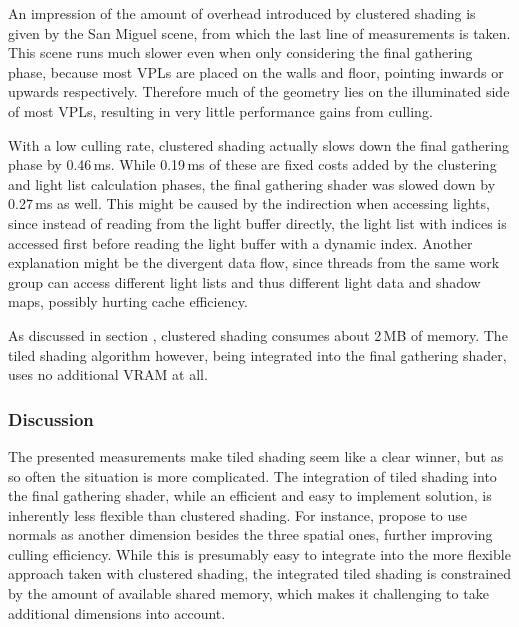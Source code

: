 An impression of the amount of overhead introduced by clustered shading is given by the San Miguel scene, from which the last line of measurements is taken. This scene runs much slower even when only considering the final gathering phase, because most VPLs are placed on the walls and floor, pointing inwards or upwards respectively. Therefore much of the geometry lies on the illuminated side of most VPLs, resulting in very little performance gains from culling.

With a low culling rate, clustered shading actually slows down the final gathering phase by 0.46\,ms. While 0.19\,ms of these are fixed costs added by the clustering and light list calculation phases, the final gathering shader was slowed down by 0.27\,ms as well. This might be caused by the indirection when accessing lights, since instead of reading from the light buffer directly, the light list with indices is accessed first before reading the light buffer with a dynamic index. Another explanation might be the divergent data flow, since threads from the same work group can access different light lists and thus different light data and shadow maps, possibly hurting cache efficiency.

As discussed in section , clustered shading consumes about 2\,MB of memory. The tiled shading algorithm however, being integrated into the final gathering shader, uses no additional VRAM at all.

\subsubsection{Discussion}

The presented measurements make tiled shading seem like a clear winner, but as so often the situation is more complicated. The integration of tiled shading into the final gathering shader, while an efficient and easy to implement solution, is inherently less flexible than clustered shading. For instance, \citet{olsson2012clustered} propose to use normals as another dimension besides the three spatial ones, further improving culling efficiency. While this is presumably easy to integrate into the more flexible approach taken with clustered shading, the integrated tiled shading is constrained by the amount of available shared memory, which makes it challenging to take additional dimensions into account.
